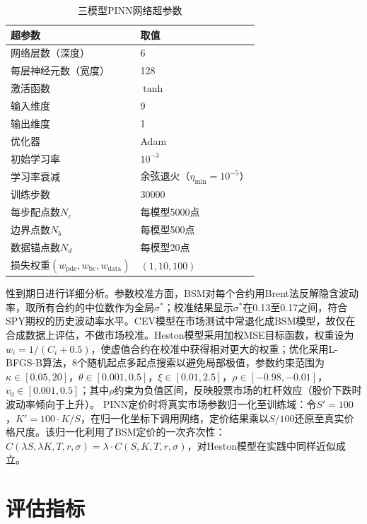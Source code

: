 \begin{table}[H]
  \centering
  \caption{三模型PINN网络超参数}
  \label{tab:hyperparams}
  \begin{tabular}{ll}
    \hline
    超参数 & 取值 \\
    \hline
    网络层数（深度） & 6 \\
    每层神经元数（宽度） & 128 \\
    激活函数 & $\tanh$ \\
    输入维度 & 9 \\
    输出维度 & 1 \\
    优化器 & Adam \cite{kingma2014adam} \\
    初始学习率 & $10^{-3}$ \\
    学习率衰减 & 余弦退火（$\eta_\text{min}=10^{-5}$） \\
    训练步数 & 30000 \\
    每步配点数$N_c$ & 每模型5000点 \\
    边界点数$N_b$ & 每模型500点 \\
    数据锚点数$N_d$ & 每模型20点 \\
    损失权重$(w_\text{pde}, w_\text{bc}, w_\text{data})$ & $(1, 10, 100)$ \\
    \hline
  \end{tabular}
\end{table}


\noindent 性到期日进行详细分析。参数校准方面，BSM对每个合约用Brent法反解隐含波动率，取所有合约的中位数作为全局$\sigma^*$；校准结果显示$\sigma^*$在0.13至0.17之间，符合SPY期权的历史波动率水平。CEV模型在市场测试中常退化成BSM模型，故仅在合成数据上评估，不做市场校准。Heston模型采用加权MSE目标函数，权重设为$w_i = 1/(C_i + 0.5)$，使虚值合约在校准中获得相对更大的权重；优化采用L-BFGS-B算法，8个随机起点多起点搜索以避免局部极值，参数约束范围为$\kappa\in[0.05,20]$，$\theta\in[0.001,0.5]$，$\xi\in[0.01,2.5]$，$\rho\in[-0.98,-0.01]$，$v_0\in[0.001,0.5]$；其中$\rho$约束为负值区间，反映股票市场的杠杆效应（股价下跌时波动率倾向于上升）。
PINN定价时将真实市场参数归一化至训练域：令$S'=100$，$K'=100\cdot K/S$，在归一化坐标下调用网络，定价结果乘以$S/100$还原至真实价格尺度。该归一化利用了BSM定价的一次齐次性：$C(\lambda S, \lambda K, T, r, \sigma) = \lambda\cdot C(S, K, T, r, \sigma)$，对Heston模型在实践中同样近似成立。

\section{评估指标}\label{sec:exp_metrics}

